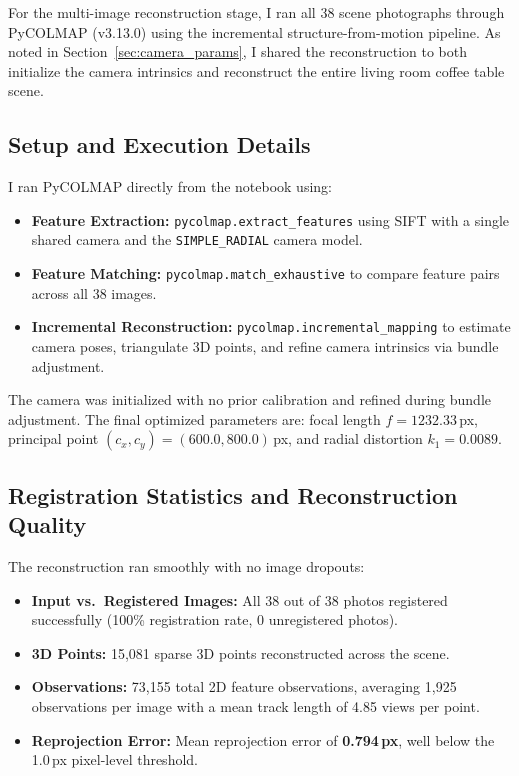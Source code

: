 \documentclass[12pt]{article}
\begin{document}
For the multi-image reconstruction stage, I ran all 38 scene photographs through PyCOLMAP (v3.13.0) using the incremental structure-from-motion pipeline. As noted in Section~\ref{sec:camera_params}, I shared the reconstruction to both initialize the camera intrinsics and reconstruct the entire living room coffee table scene.

\subsection{Setup and Execution Details}
I ran PyCOLMAP directly from the notebook using:
\begin{itemize}
    \item \textbf{Feature Extraction:} \texttt{pycolmap.extract\_features} using SIFT with a single shared camera and the \texttt{SIMPLE\_RADIAL} camera model.
    \item \textbf{Feature Matching:} \texttt{pycolmap.match\_exhaustive} to compare feature pairs across all 38 images.
    \item \textbf{Incremental Reconstruction:} \texttt{pycolmap.incremental\_mapping} to estimate camera poses, triangulate 3D points, and refine camera intrinsics via bundle adjustment.
\end{itemize}

The camera was initialized with no prior calibration and refined during bundle adjustment. The final optimized parameters are: focal length $f = 1232.33$\,px, principal point $(c_x, c_y) = (600.0, 800.0)$\,px, and radial distortion $k_1 = 0.0089$.

\subsection{Registration Statistics and Reconstruction Quality}
The reconstruction ran smoothly with no image dropouts:
\begin{itemize}
    \item \textbf{Input vs.\ Registered Images:} All 38 out of 38 photos registered successfully (100\% registration rate, 0 unregistered photos).
    \item \textbf{3D Points:} 15,081 sparse 3D points reconstructed across the scene.
    \item \textbf{Observations:} 73,155 total 2D feature observations, averaging 1,925 observations per image with a mean track length of 4.85 views per point.
    \item \textbf{Reprojection Error:} Mean reprojection error of \textbf{0.794\,px}, well below the 1.0\,px pixel-level threshold.
\end{itemize}
\end{document}

